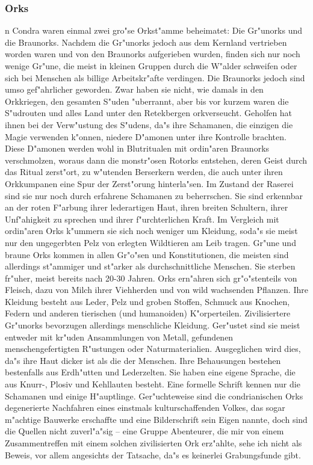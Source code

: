 \documentclass[a5paper,8pt]{book}
\begin{document}
\newpage

\subsubsection{ Orks}

n Condra waren einmal zwei gro"se Orkst"amme beheimatet: Die Gr"unorks und die Braunorks.  Nachdem die Gr"unorks jedoch aus dem Kernland vertrieben worden waren und von den Braunorks 
aufgerieben wurden, finden sich nur noch wenige Gr"une, die meist in kleinen Gruppen durch die W"alder schweifen oder sich bei Menschen als billige Arbeitskr"afte verdingen. Die Braunorks jedoch sind umso gef"ahrlicher geworden. Zwar haben sie nicht, wie damals in den Orkkriegen, den gesamten S"uden "uberrannt, aber bis vor kurzem waren die S"udrouten und alles Land unter den Retekbergen orkverseucht. Geholfen hat ihnen bei der Verw"ustung des S"udens, da"s ihre Schamanen, die einzigen die Magie verwenden k"onnen, niedere D"amonen unter ihre Kontrolle brachten. Diese D"amonen werden wohl in Blutritualen mit ordin"aren Braunorks verschmolzen, woraus dann die monstr"osen Rotorks entstehen, deren Geist durch das Ritual zerst"ort, zu w"utenden Berserkern werden, die auch unter ihren Orkkumpanen eine Spur der Zerst"orung hinterla"sen. Im Zustand der Raserei sind sie nur noch durch erfahrene Schamanen zu beherrschen. Sie sind erkennbar an der roten F"arbung ihrer lederartigen Haut, ihren breiten Schultern, ihrer 
Unf"ahigkeit zu sprechen und ihrer f"urchterlichen Kraft. Im Vergleich mit ordin"aren Orks k"ummern sie sich noch weniger um Kleidung, soda"s sie meist nur den ungegerbten Pelz von erlegten Wildtieren am Leib tragen. Gr"une und braune Orks kommen in allen Gr"o"sen und Konstitutionen, die meisten sind allerdings st"ammiger und st"arker als durchschnittliche Menschen. Sie sterben fr"uher, meist bereits nach 20-30 Jahren. Orks ern"ahren sich gr"o"stenteils von Fleisch, dazu von Milch ihrer Viehherden und von wild wachsenden Pflanzen. Ihre Kleidung besteht aus Leder, Pelz und groben Stoffen, Schmuck aus Knochen, Federn und anderen tierischen (und humanoiden) K"orperteilen. Zivilisiertere Gr"unorks bevorzugen allerdings menschliche Kleidung. Ger"ustet sind sie meist entweder mit kr"uden Ansammlungen von Metall, gefundenen menschengefertigten R"ustungen oder Naturmaterialien. Ausgeglichen wird dies, da"s ihre Haut dicker ist als die der Menschen. Ihre Behausungen bestehen bestenfalls aus Erdh"utten und Lederzelten.
 Sie haben eine eigene Sprache, die aus Knurr-, Plosiv und Kehllauten besteht. Eine formelle Schrift kennen nur die Schamanen und einige H"auptlinge. Ger"uchteweise sind die condrianischen Orks degenerierte Nachfahren eines einstmals kulturschaffenden Volkes, das sogar m"achtige Bauwerke erschaffte und eine Bilderschrift sein Eigen nannte, doch sind die Quellen nicht zuverl"a"sig – eine Gruppe Abenteurer, die mir von einem Zusammentreffen mit einem solchen zivilisierten Ork erz"ahlte, sehe ich nicht als Beweis, vor allem angesichts der Tatsache, da"s es keinerlei Grabungsfunde gibt. 
\end{document}
